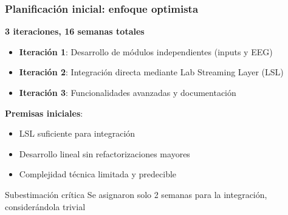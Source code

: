 \documentclass[10pt,thmsa]{beamer}
\theoremstyle{plain}
\begin{document}
\begin{frame}
\frametitle{Planificación inicial: enfoque optimista}

\textbf{3 iteraciones, 16 semanas totales}

\begin{itemize}
\item \textbf{Iteración 1}: Desarrollo de módulos independientes (inputs y EEG)
\item \textbf{Iteración 2}: Integración directa mediante Lab Streaming Layer (LSL)
\item \textbf{Iteración 3}: Funcionalidades avanzadas y documentación
\end{itemize}

\vspace{1em}

\textbf{Premisas iniciales}:
\begin{itemize}
\item LSL suficiente para integración
\item Desarrollo lineal sin refactorizaciones mayores
\item Complejidad técnica limitada y predecible
\end{itemize}

\vspace{0.5em}

\begin{alertblock}{Subestimación crítica}
Se asignaron solo 2 semanas para la integración, considerándola trivial
\end{alertblock}

\end{frame}
\end{document}
